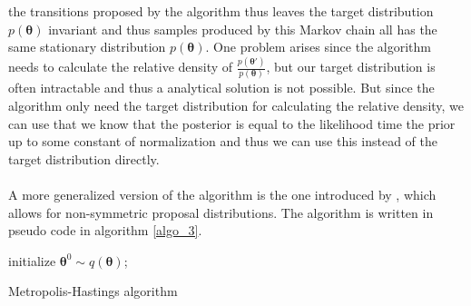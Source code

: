 the transitions proposed by the algorithm thus leaves the target distribution $p(\boldsymbol{\theta})$ invariant and thus samples produced by this Markov chain all has the same stationary distribution $p(\boldsymbol{\theta})$. One problem arises since the algorithm needs to calculate the relative density of $\frac{p(\boldsymbol{\theta'})}{p\left(\boldsymbol{\theta}\right)}$, but our target distribution is often intractable and thus a analytical solution is not possible. But since the algorithm only need the target distribution for calculating the relative density, we can use that we know that the posterior is equal to the likelihood time the prior up to some constant of normalization and thus we can use this instead of the target distribution directly.\\
\\
A more generalized version of the algorithm is the one introduced by \cite{hastings70}, which allows for non-symmetric proposal distributions. The algorithm is written in pseudo code in algorithm \ref{algo_3}.

\begin{algorithm}[H]\label{algo_3}
\SetAlgoLined
initialize $\boldsymbol{\theta}^0\sim q(\boldsymbol{\theta})$;

    
 
\caption{Metropolis-Hastings algorithm}
\end{algorithm}









